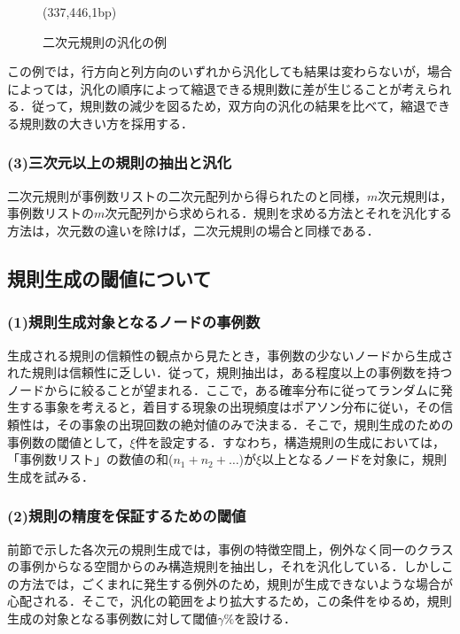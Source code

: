 \begin{figure}[thb]
\begin{center}
\begin{epsf}
\end{epsf}
\begin{draft}
\atari(337,446,1bp)
\end{draft}
\end{center}
\vspace*{-4mm}
\caption{二次元規則の汎化の例}
\label{fig:二次元規則の汎化の例}
\end{figure}

この例では，行方向と列方向のいずれから汎化しても結果は変わらないが，場合
によっては，汎化の順序によって縮退できる規則数に差が生じることが考えられ
る．従って，規則数の減少を図るため，双方向の汎化の結果を比べて，縮退でき
る規則数の大きい方を採用する．
\subsubsection{(3)三次元以上の規則の抽出と汎化}

二次元規則が事例数リストの二次元配列から得られたのと同様，$m$次元規則は，
事例数リストの$m$次元配列から求められる．規則を求める方法とそれを汎化する
方法は，次元数の違いを除けば，二次元規則の場合と同様である．
\subsection{規則生成の閾値について}
\subsubsection*{(1)規則生成対象となるノードの事例数}

生成される規則の信頼性の観点から見たとき，事例数の少ないノードから生成さ
れた規則は信頼性に乏しい．従って，規則抽出は，ある程度以上の事例数を持つ
ノードからに絞ることが望まれる．ここで，ある確率分布に従ってランダムに発
生する事象を考えると，着目する現象の出現頻度はポアソン分布に従い，その信
頼性は，その事象の出現回数の絶対値のみで決まる．そこで，規則生成のための
事例数の閾値として，$\xi$件を設定する．すなわち，構造規則の生成においては，
「事例数リスト」の数値の和(${n_1+n_2+}\dots$)が$\xi$以上となるノードを対象に，規則生成を試みる．
\subsubsection*{(2)規則の精度を保証するための閾値}

前節で示した各次元の規則生成では，事例の特徴空間上，例外なく同一のクラス
の事例からなる空間からのみ構造規則を抽出し，それを汎化している．しかしこ
の方法では，ごくまれに発生する例外のため，規則が生成できないような場合が
心配される．そこで，汎化の範囲をより拡大するため，この条件をゆるめ，規則
生成の対象となる事例数に対して閾値$\gamma \%$を設ける．

